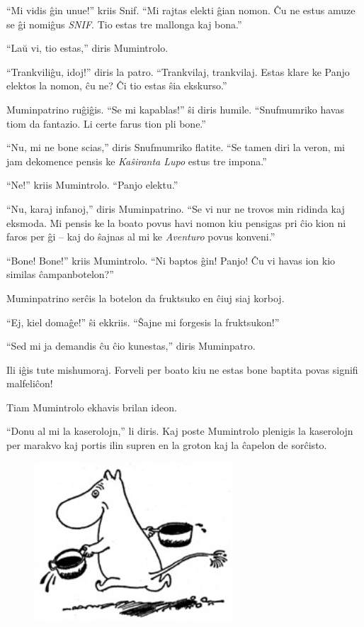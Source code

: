 ``Mi vidis ĝin unue!'' kriis Snif. ``Mi rajtas elekti ĝian nomon. Ĉu ne estus amuze se ĝi nomiĝus \emph{SNIF}. Tio estas tre mallonga kaj bona.''

``Laŭ vi, tio estas,'' diris Mumintrolo.

``Trankviliĝu, idoj!'' diris la patro. ``Trankvilaj, trankvilaj. Estas klare ke Panjo elektos la nomon, ĉu ne? Ĉi tio estas ŝia ekskurso.''

Muminpatrino ruĝiĝis. ``Se mi kapablas!'' ŝi diris humile. ``Snufmumriko havas tiom da fantazio. Li certe farus tion pli bone.''

``Nu, mi ne bone scias,'' diris Snufmumriko flatite. ``Se tamen diri la veron, mi jam dekomence pensis ke \emph{Kaŝiranta Lupo} estus tre impona.''

``Ne!'' kriis Mumintrolo. ``Panjo elektu.''

``Nu, karaj infanoj,'' diris Muminpatrino. ``Se vi nur ne trovos min ridinda kaj eksmoda. Mi pensis ke la boato povus havi nomon kiu pensigas pri ĉio kion ni faros per ĝi -- kaj do ŝajnas al mi ke \emph{Aventuro} povus konveni.''

``Bone! Bone!'' kriis Mumintrolo. ``Ni baptos ĝin! Panjo! Ĉu vi havas ion kio similas ĉampanbotelon?''

Muminpatrino serĉis la botelon da fruktsuko en ĉiuj siaj korboj.

``Ej, kiel domaĝe!'' ŝi ekkriis. ``Ŝajne mi forgesis la fruktsukon!''

``Sed mi ja demandis ĉu ĉio kunestas,'' diris Muminpatro.

Ili iĝis tute mishumoraj. Forveli per boato kiu ne estas bone baptita povas signifi malfeliĉon!

Tiam Mumintrolo ekhavis brilan ideon.

``Donu al mi la kaserolojn,'' li diris. Kaj poste Mumintrolo plenigis la kaserolojn per marakvo kaj portis ilin supren en la groton kaj la ĉapelon de sorĉisto.

\begin{figure}[htbp]
\centering
\includegraphics[width=209pt,height=169pt]{f0045-01.jpg}
\caption{}
\label{f0045-01}
\end{figure}

